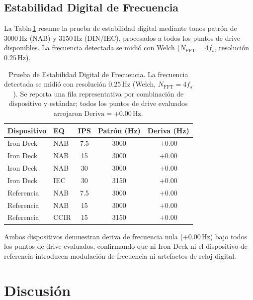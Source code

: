 \documentclass[10pt,conference]{IEEEtran}
\begin{document}
\subsection{Estabilidad Digital de Frecuencia}
\label{sec:estabilidad}

La Tabla\,\ref{tab:estabilidad} resume la prueba de estabilidad digital mediante tonos patrón
de $3000\,\text{Hz}$ (NAB) y $3150\,\text{Hz}$ (DIN/IEC), procesados a todos los puntos de
drive disponibles. La frecuencia detectada se midió con Welch ($N_{\text{FFT}} = 4f_s$,
resolución $0.25\,\text{Hz}$).

\begin{table}[htbp]
\caption{Prueba de Estabilidad Digital de Frecuencia. La frecuencia detectada se midió
con resolución $0.25\,\text{Hz}$ (Welch, $N_\text{FFT}=4f_s$). Se reporta una fila
representativa por combinación de dispositivo y estándar; todos los puntos de drive
evaluados arrojaron $\text{Deriva}=+0.00\,\text{Hz}$.}
\label{tab:estabilidad}
\centering
\small
\begin{tabular}{llccc}
\toprule
Dispositivo & EQ & IPS & Patrón (Hz) & Deriva (Hz) \\
\midrule
Iron Deck & NAB & 7.5 & 3000 & $+0.00$ \\
Iron Deck & NAB & 15  & 3000 & $+0.00$ \\
Iron Deck & NAB & 30  & 3000 & $+0.00$ \\
Iron Deck & IEC & 30  & 3150 & $+0.00$ \\
\midrule
Referencia & NAB  & 7.5 & 3000 & $+0.00$ \\
Referencia & NAB  & 15  & 3000 & $+0.00$ \\
Referencia & CCIR & 15  & 3150 & $+0.00$ \\
\bottomrule
\end{tabular}
\end{table}

Ambos dispositivos demuestran deriva de frecuencia nula ($+0.00\,\text{Hz}$) bajo todos los
puntos de drive evaluados, confirmando que ni Iron Deck ni el dispositivo de referencia
introducen modulación de frecuencia ni artefactos de reloj digital.

\section{Discusión}
\end{document}
